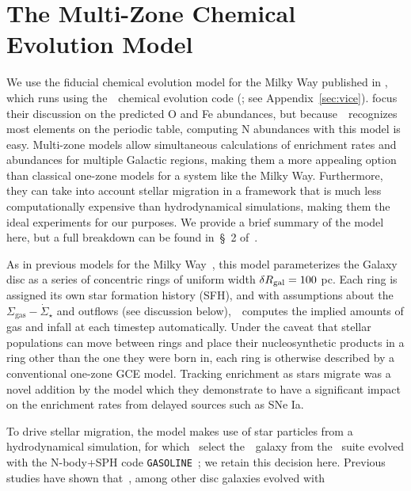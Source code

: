 \documentclass[ms.tex]{subfiles}
\begin{document}
\section{The Multi-Zone Chemical Evolution Model}
\label{sec:multizone}

We use the fiducial chemical evolution model for the Milky Way published in
\citet{Johnson2021}, which runs using the~\vice~chemical evolution code
(\citealp{Johnson2020, Griffith2021a}; see Appendix~\ref{sec:vice}).
\citet{Johnson2021} focus their discussion on the predicted O and Fe
abundances, but because~\vice~recognizes most elements on the periodic table,
computing N abundances with this model is easy.
Multi-zone models allow simultaneous calculations of enrichment rates and
abundances for multiple Galactic regions, making them a more appealing option
than classical one-zone models for a system like the Milky Way.
Furthermore, they can take into account stellar migration in a framework that
is much less computationally expensive than hydrodynamical simulations, making
them the ideal experiments for our purposes.
We provide a brief summary of the model here, but a full breakdown can be found
in~\S~2 of~\citet{Johnson2021}.
\par
As in previous models for the Milky Way~\citep[e.g.][]{Matteucci1989,
Schoenrich2009, Minchev2013, Minchev2014, Minchev2017, Sharma2021}, this model
parameterizes the Galaxy disc as a series of concentric rings of uniform width
$\delta R_\text{gal} = 100$ pc.
Each ring is assigned its own star formation history (SFH), and with
assumptions about the~$\Sigma_\text{gas}-\dot{\Sigma}_\star$ and outflows (see
discussion below),~\vice~computes the implied amounts of gas and infall at each
timestep automatically.
Under the caveat that stellar populations can move between rings and place
their nucleosynthetic products in a ring other than the one they were born in,
each ring is otherwise described by a conventional one-zone GCE model.
Tracking enrichment as stars migrate was a novel addition by the
\citet{Johnson2021} model which they demonstrate to have a significant impact
on the enrichment rates from delayed sources such as SNe Ia.
\par
To drive stellar migration, the model makes use of star particles from a
hydrodynamical simulation, for which~\citet{Johnson2021} select the~\hsim~galaxy
from the~\citet{Christensen2012} suite evolved with the N-body+SPH code
\texttt{GASOLINE}~\citep[][SPH: Smoothed Particle Hydrodynamics]{Wadsley2004};
we retain this decision here.
Previous studies have shown that~\hsim, among other disc galaxies evolved with
\end{document}
